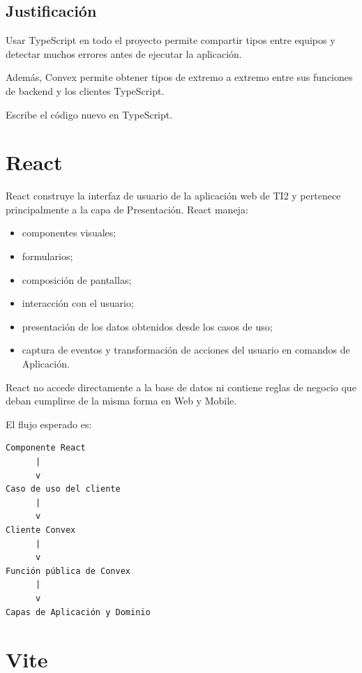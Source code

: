 \documentclass[11pt,a4paper]{article}
\begin{document}
\subsection{Justificación}

Usar TypeScript en todo el proyecto permite compartir tipos entre equipos y
detectar muchos errores antes de ejecutar la aplicación.

Además, Convex permite obtener tipos de extremo a extremo entre sus funciones
de backend y los clientes TypeScript.

Escribe el código nuevo en TypeScript.

\section{React}

React construye la interfaz de usuario de la aplicación web de TI2 y pertenece
principalmente a la capa de Presentación. React maneja:

\begin{itemize}
  \item componentes visuales;
  \item formularios;
  \item composición de pantallas;
  \item interacción con el usuario;
  \item presentación de los datos obtenidos desde los casos de uso;
  \item captura de eventos y transformación de acciones del usuario en
    comandos de Aplicación.
\end{itemize}

React no accede directamente a la base de datos ni contiene reglas de negocio
que deban cumplirse de la misma forma en Web y Mobile.

El flujo esperado es:

\begin{lstlisting}
Componente React
      |
      v
Caso de uso del cliente
      |
      v
Cliente Convex
      |
      v
Función pública de Convex
      |
      v
Capas de Aplicación y Dominio
\end{lstlisting}

\section{Vite}
\end{document}
